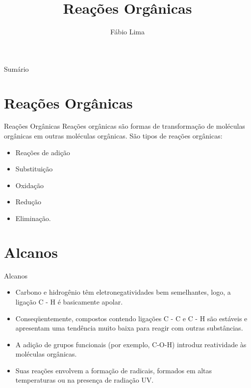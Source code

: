 \documentclass[presentation,professionalfonts,aspectratio=169]{beamer}
\date{}
\author{Fábio Lima}
\date{}
\title{Reações Orgânicas}
\begin{document}
\begingroup
  \maketitle
  \endgroup
\begin{frame}{Sumário}
\tableofcontents
\end{frame}


\section{Reações Orgânicas}
\label{sec:orgf15e8e9}
\begin{frame}[label={sec:org3ad96f8}]{Reações Orgânicas}
Reações orgânicas são formas de transformação de moléculas orgânicas em outras moléculas orgânicas. São tipos de reações orgânicas:
\begin{itemize}
\item Reações de adição
\item Substituição
\item Oxidação
\item Redução
\item Eliminação.
\end{itemize}
\end{frame}

\section{Alcanos}
\label{sec:orgd5a26bb}

\begin{frame}[label={sec:orgff4c293}]{Alcanos}
\begin{itemize}
\item Carbono e hidrogênio têm eletronegatividades bem semelhantes, logo, a ligação C - H é basicamente apolar.
\item Conseqüentemente, compostos contendo ligações C - C e C - H são estáveis e apresentam uma tendência muito baixa para reagir com outras substâncias.
\item A adição de grupos funcionais (por exemplo, C-O-H) introduz reatividade às moléculas orgânicas.
\item Suas reações envolvem a formação de radicais, formados em altas temperaturas ou na presença de radiação UV.
\end{itemize}
\end{frame}
\end{document}
